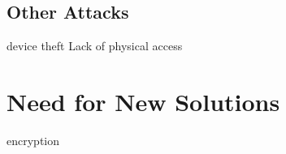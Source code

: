 \subsection{Other Attacks}

device theft
Lack of physical access

\section{Need for New Solutions}

encryption

